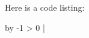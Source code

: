 

Here is a code listing:

\ttverbatim
\newcount\x
{}
\loop
	\x
	\advance\x by -1
	\ifnum\x > 0
\repeat
|

\bye
